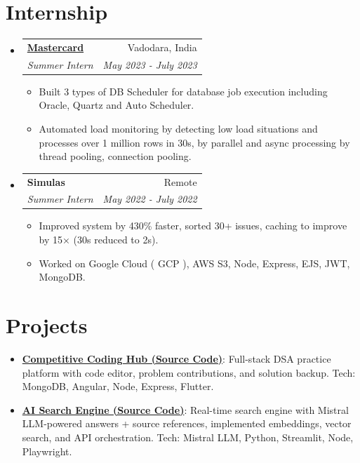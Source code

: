 \documentclass[a4paper,10pt]{article}
\makeatletter
\newcommand{\resumeItem}[2]{
  \item\small{
    \textbf{#1}{: #2 \vspace{-2pt}}
  }
}
\newcommand{\resumeSubheading}[4]{
  \vspace{-1pt}\item
    \begin{tabular*}{0.97\textwidth}{l@{\extracolsep{\fill}}r}
      \textbf{#1} & #2 \\
      \textit{#3} & \textit{#4} \\
    \end{tabular*}\vspace{-5pt}
}
\newcommand{\resumeSubItem}[2]{\resumeItem{#1}{#2}\vspace{-3pt}}
\newcommand{\resumeSubHeadingListStart}{\begin{itemize}[leftmargin=*]}
\newcommand{\resumeSubHeadingListEnd}{\end{itemize}}
\newcommand{\resumeItemListStart}{\begin{itemize}}
\newcommand{\resumeItemListEnd}{\end{itemize}\vspace{-5pt}}
\makeatother
\begin{document}
\section{Internship}
  \resumeSubHeadingListStart
    \resumeSubheading{\href{https://www.mastercard.co.in/en-in.html}{Mastercard}}{Vadodara, India}
    {Summer Intern}{May 2023 - July 2023}
    \resumeItemListStart
        \item Built 3 types of DB Scheduler for database job execution including Oracle, Quartz and Auto Scheduler.
        \item Automated load monitoring by detecting low load situations and processes over 1 million rows in 30s, by parallel and async processing by thread pooling, connection pooling.
      \resumeItemListEnd
\vspace{-5pt}
    \resumeSubheading{Simulas}{Remote}
		{Summer Intern}{May 2022 - July 2022}
		\resumeItemListStart
        \item Improved system by 430\% faster, sorted 30+ issues, caching to improve by 15× (30s reduced to 2s).
        \item Worked on Google Cloud ( GCP ), AWS S3, Node,  Express, EJS, JWT, MongoDB.	
		\resumeItemListEnd
\vspace{2pt}
\resumeSubHeadingListEnd

\section{Projects}
\resumeSubHeadingListStart
\resumeSubItem{\href{https://github.com/om-ashish-soni/competitive-coding-hub}
{Competitive Coding Hub (Source Code)}} {Full-stack DSA practice platform with code editor, problem contributions, and solution backup. Tech: MongoDB, Angular, Node, Express, Flutter.}
\vspace{2pt}
\resumeSubItem{\href{https://github.com/om-ashish-soni/ai_search_engine}
{AI Search Engine (Source Code)}} {Real-time search engine with Mistral LLM-powered answers + source references, implemented embeddings, vector search, and API orchestration. Tech: Mistral LLM, Python, Streamlit, Node, Playwright.}
\vspace{4pt}
\resumeSubHeadingListEnd

\end{document}

